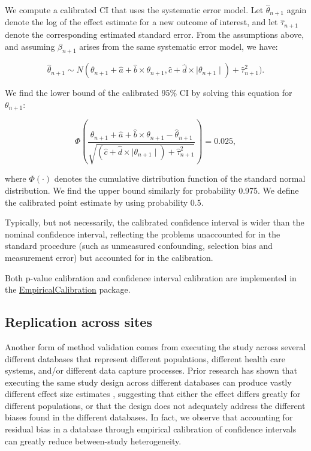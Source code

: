 \documentclass[11pt]{book}
\begin{document}
We compute a calibrated CI that uses the systematic error model. Let
\(\hat{\theta}_{n+1}\) again denote the log of the effect estimate for a
new outcome of interest, and let \(\hat{\tau}_{n+1}\) denote the
corresponding estimated standard error. From the assumptions above, and
assuming \(\beta_{n+1}\) arises from the same systematic error model, we
have:

\[\hat{\theta}_{n+1} \sim N(
\theta_{n+1} + \hat{a} + \hat{b} \times \theta_{n+1},
\hat{c} + \hat{d} \times \mid \theta_{n+1} \mid) + \hat{\tau}_{n+1}^2) .\]

We find the lower bound of the calibrated 95\% CI by solving this
equation for \(\theta_{n+1}\):

\[\Phi\left(
\frac{\theta_{n+1} + \hat{a} + \hat{b} \times \theta_{n+1}-\hat{\theta}_{n+1}}
{\sqrt{(\hat{c} + \hat{d} \times \mid \theta_{n+1} \mid) + \hat{\tau}_{n+1}^2}}
\right) = 0.025 ,\]

where \(\Phi(\cdot)\) denotes the cumulative distribution function of
the standard normal distribution. We find the upper bound similarly for
probability 0.975. We define the calibrated point estimate by using
probability 0.5.

Typically, but not necessarily, the calibrated confidence interval is
wider than the nominal confidence interval, reflecting the problems
unaccounted for in the standard procedure (such as unmeasured
confounding, selection bias and measurement error) but accounted for in
the calibration.

Both p-value calibration and confidence interval calibration are
implemented in the
\href{https://ohdsi.github.io/EmpiricalCalibration/}{EmpiricalCalibration}
package.

\subsection{Replication across sites}\label{replication-across-sites}

Another form of method validation comes from executing the study across
several different databases that represent different populations,
different health care systems, and/or different data capture processes.
Prior research has shown that executing the same study design across
different databases can produce vastly different effect size estimates
\citep{madigan_2013}, suggesting that either the effect differs greatly
for different populations, or that the design does not adequately
address the different biases found in the different databases. In fact,
we observe that accounting for residual bias in a database through
empirical calibration of confidence intervals can greatly reduce
between-study heterogeneity. \citep{schuemie_2018}
\end{document}
